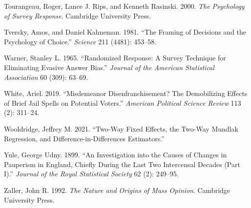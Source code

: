 \documentclass[
]{article}
\newlength{\cslhangindent}
\newenvironment{CSLReferences}[2] %
 {\begin{list}{}{%
  \setlength{\itemindent}{0pt}
  \setlength{\leftmargin}{0pt}
  \setlength{\parsep}{0pt}
  \ifodd #1
   \setlength{\leftmargin}{\cslhangindent}
   \setlength{\itemindent}{-1\cslhangindent}
  \fi
  \setlength{\itemsep}{#2\baselineskip}}}
 {\end{list}}
\begin{document}
\begin{CSLReferences}{1}{0}
Tourangeau, Roger, Lance J. Rips, and Kenneth Rasinski. 2000. \emph{The Psychology of Survey Response}. Cambridge University Press.

Tversky, Amos, and Daniel Kahneman. 1981. {``The Framing of Decisions and the Psychology of Choice.''} \emph{Science} 211 (4481): 453--58.

Warner, Stanley L. 1965. {``Randomized Response: A Survey Technique for Eliminating Evasive Answer Bias.''} \emph{Journal of the American Statistical Association} 60 (309): 63--69.

White, Ariel. 2019. {``Misdemeanor Disenfranchisement? {The} Demobilizing Effects of Brief Jail Spells on Potential Voters.''} \emph{American Political Science Review} 113 (2): 311--24.

Wooldridge, Jeffrey M. 2021. {``Two-Way Fixed Effects, the Two-Way Mundlak Regression, and Difference-in-Differences Estimators.''}

Yule, George Udny. 1899. {``An Investigation into the Causes of Changes in Pauperism in {England}, Chiefly During the Last Two Intercensal Decades ({Part I}).''} \emph{Journal of the Royal Statistical Society} 62 (2): 249--95.

Zaller, John R. 1992. \emph{The Nature and Origins of Mass Opinion}. Cambridge University Press.

\end{CSLReferences}
\end{document}
